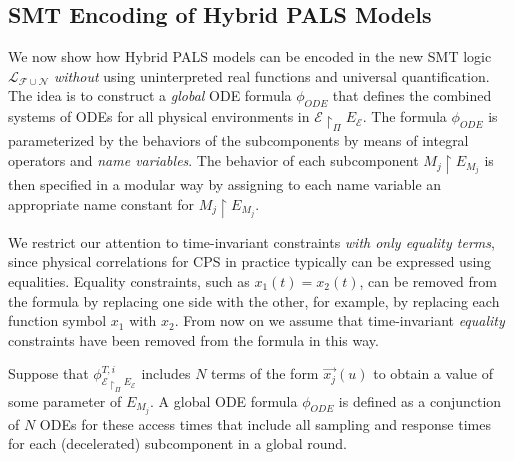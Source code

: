 \subsection{SMT Encoding of Hybrid PALS Models}


We now show how Hybrid PALS models
can be  encoded in the new SMT logic $\mathcal{L}_{\mathcal{F}\cup\mathcal{N}}$
\emph{without}  using uninterpreted real functions and universal quantification.
The idea is to construct a \emph{global} ODE formula $\phi_{\mathit{ODE}}$
that defines the combined systems of ODEs for all physical environments
in $\mathcal{E} \restriction_{\Pi} E_\mathcal{E}$.
The formula $\phi_{\mathit{ODE}}$ is parameterized by the behaviors of 
the subcomponents by means of integral operators and \emph{name variables}.
The behavior of each subcomponent $M_j \restriction E_{M_j}$ is then
specified in a modular way by assigning to each name variable an appropriate name constant for $M_j \restriction E_{M_j}$.

We restrict our attention to time-invariant constraints \emph{with only equality terms},
since physical correlations for CPS in practice typically can be expressed using
equalities.
Equality  constraints, such as $x_1(t) = x_2(t)$,  can be removed
from the formula  by replacing one side with the other, 
for example, by replacing each function symbol $x_1$ with  $x_2$.
From now on we assume that time-invariant \emph{equality} constraints
have been  removed from the formula 
in this way.



Suppose that %
$\phi_{\mathcal{E} \restriction_{\Pi} E_\mathcal{E}}^{T,i}$ 
includes $N$ terms of the form $\vec{x_j}(u)$ to obtain a value of some parameter of $E_{M_j}$.
A global ODE formula $\phi_{\mathit{ODE}}$
is defined as a conjunction of $N$ ODEs for these access times
that include all sampling and response times for each (decelerated) subcomponent in a global round.

